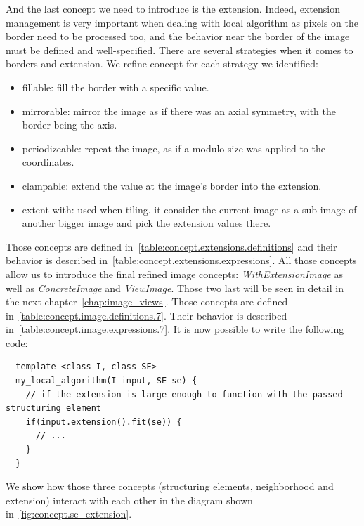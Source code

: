 And the last concept we need to introduce is the extension. Indeed, extension management is very important when dealing
with local algorithm as pixels on the border need to be processed too, and the behavior near the border of the image
must be defined and well-specified. There are several strategies when it comes to borders and extension. We refine
concept for each strategy we identified:
\begin{itemize}
  \item fillable: fill the border with a specific value.
  \item mirrorable: mirror the image as if there was an axial symmetry, with the border being the axis.
  \item periodizeable: repeat the image, as if a modulo size was applied to the coordinates.
  \item clampable: extend the value at the image's border into the extension.
  \item extent with: used when tiling. it consider the current image as a sub-image of another bigger image and pick the
        extension values there.
\end{itemize}
Those concepts are defined in~\cref{table:concept.extensions.definitions} and their behavior is described
in~\cref{table:concept.extensions.expressions}. All those concepts allow us to introduce the final refined image
concepts: \emph{WithExtensionImage} as well as \emph{ConcreteImage} and \emph{ViewImage}. Those two last will be seen in
detail in the next chapter~\ref{chap:image_views}. Those concepts are defined
in~\cref{table:concept.image.definitions.7}. Their behavior is described in~\cref{table:concept.image.expressions.7}. It
is now possible to write the following code:
\begin{verbatim}
  template <class I, class SE>
  my_local_algorithm(I input, SE se) {
    // if the extension is large enough to function with the passed structuring element
    if(input.extension().fit(se)) {
      // ...
    }
  }
\end{verbatim}

We show how those three concepts (structuring elements, neighborhood and extension) interact with each other in the
diagram shown in~\cref{fig:concept.se_extension}.

